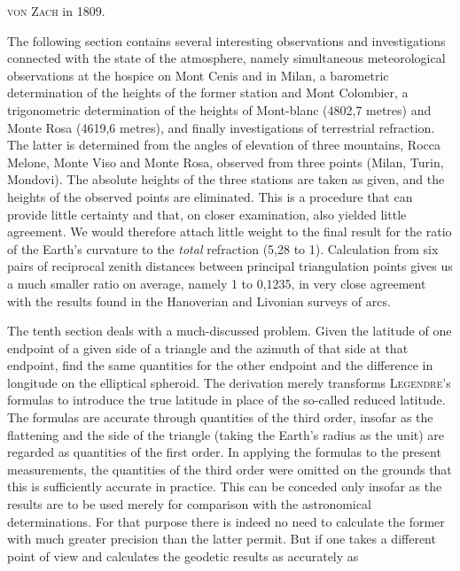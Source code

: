 %
\textsc{von} \textsc{Zach} in 1809.

The following section contains several interesting observations and investigations connected with the state of the atmosphere, namely simultaneous meteorological observations at the hospice on Mont Cenis and in Milan, a barometric determination of the heights of the former station and Mont Colombier, a trigonometric determination of the heights of Mont-blanc (4802,7 metres) and Monte Rosa (4619,6 metres), and finally investigations of terrestrial refraction. The latter is determined from the angles of elevation of three mountains, Rocca Melone, Monte Viso and Monte Rosa, observed from three points (Milan, Turin, Mondovi). The absolute heights of the three stations are taken as given, and the heights of the observed points are eliminated. This is a procedure that can provide little certainty and that, on closer examination, also yielded little agreement. We would therefore attach little weight to the final result for the ratio of the Earth's curvature to the \textit{total} refraction (5,28 to 1). Calculation from six pairs of reciprocal zenith distances between principal triangulation points gives us a much smaller ratio on average, namely 1 to 0,1235, in very close agreement with the results found in the Hanoverian and Livonian surveys of arcs.

The tenth section deals with a much-discussed problem. Given the latitude of one endpoint of a given side of a triangle and the azimuth of that side at that endpoint, find the same quantities for the other endpoint and the difference in longitude on the elliptical spheroid. The derivation merely transforms \textsc{Legendre}'s formulas to introduce the true latitude in place of the so-called reduced latitude. The formulas are accurate through quantities of the third order, insofar as the flattening and the side of the triangle (taking the Earth's radius as the unit) are regarded as quantities of the first order. In applying the formulas to the present measurements, the quantities of the third order were omitted on the grounds that this is sufficiently accurate in practice. This can be conceded only insofar as the results are to be used merely for comparison with the astronomical determinations. For that purpose there is indeed no need to calculate the former with much greater precision than the latter permit. But if one takes a different point of view and calculates the geodetic results as accurately as
